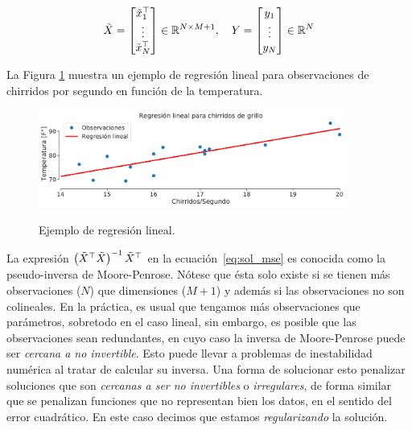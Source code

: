\begin{equation}
  \tilde{X} = \left[ \begin{matrix}\tilde{x}_1^\top \\\vdots \\ \tilde{x}_N^\top \end{matrix}\right]\in{\mathbb R}^{N\times M+1} ,\quad
  Y = \left[ \begin{matrix}y_1 \\\vdots \\y_N \end{matrix}\right] \in{\mathbb R}^{N}
 \label{eq:matrices_X} 
\end{equation}

La Figura \ref{fig:reg_lin_1} muestra un ejemplo de regresión lineal para observaciones de chirridos por segundo en función de la temperatura. 

\begin{figure}[h]
	\centering
	\includegraphics[width=0.9\textwidth]{img/cap1_chirridos.pdf}\\
	\caption{Ejemplo de regresión lineal.}
	\label{fig:reg_lin_1}
\end{figure}




La expresión $\left(\tilde{X}^\top\tilde{X} \right)^{-1} \tilde{X}^\top$ en la ecuación~\eqref{eq:sol_mse} es conocida como la pseudo-inversa de Moore-Penrose. Nótese que ésta solo existe si se tienen más observaciones ($N$) que dimensiones ($M+1$) y además si las observaciones no son colineales. En la práctica, es usual que tengamos más observaciones que parámetros, sobretodo en el caso lineal, sin embargo, es posible que las observaciones sean redundantes, en cuyo caso la inversa de Moore-Penrose puede ser \emph{cercana a no invertible}. Esto puede llevar a problemas de inestabilidad numérica al tratar de calcular su inversa. Una forma de solucionar esto penalizar soluciones que son \emph{cercanas a ser no invertibles} o \emph{irregulares}, de forma similar que se penalizan funciones que no representan bien los datos, en el sentido del error cuadrático. En este caso decimos que estamos \emph{regularizando} la solución.

